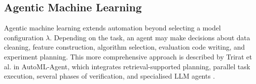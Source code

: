\documentclass[acmsmall,screen]{acmart}
\begin{document}






\subsection{Agentic Machine Learning}

Agentic machine learning extends automation beyond selecting a model configuration $\lambda$. Depending on the task, an agent may make decisions about data cleaning, feature construction, algorithm selection, evaluation code writing, and experiment planning. This more comprehensive approach is described by Trirat et al. in AutoML-Agent, which integrates retrieval-supported planning, parallel task execution, several phases of verification, and specialised LLM agents \cite{trirat2025}.
\end{document}
